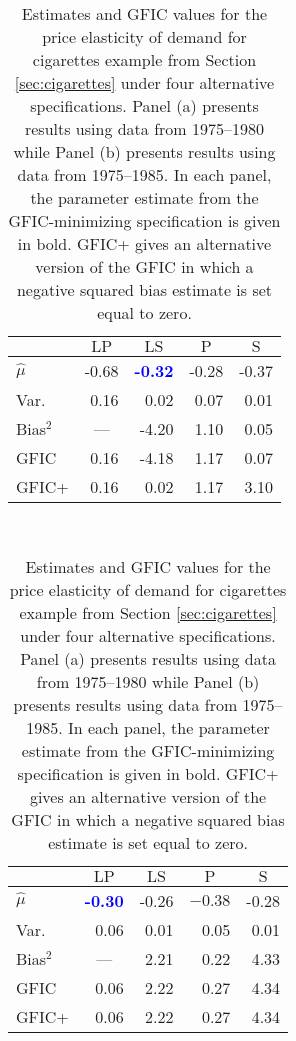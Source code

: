 \begin{table}[htbp]
    \begin{subtable}[h]{0.45\textwidth}
        \centering
 \caption{1975--1980 ($T=6$)}
 \label{tab:cigaretteShort}
      \begin{tabular}{lrrrr}\hline\hline
          & \multicolumn{1}{c}{$\text{LP}$} & \multicolumn{1}{c}{$\text{LS}$} 
          & \multicolumn{1}{c}{$\text{P}$} & \multicolumn{1}{c}{$\text{S}$}\\
          \hline
          $\widehat{\mu}$ & -0.68 & \textcolor{blue}{\textbf{-0.32}} &  -0.28 &  -0.37\\
        Var.\ &0.16 & 0.02 & 0.07 & 0.01\\ 
        Bias$^2$ & \multicolumn{1}{c}{---} & -4.20 & 1.10 & 0.05\\
        GFIC &0.16 & -4.18 & 1.17 & 0.07\\
        GFIC+ &0.16 & 0.02 & 1.17 & 3.10\\
        \hline
      \end{tabular}
    \end{subtable}
    ~
    \begin{subtable}[h]{0.45\textwidth}
      \centering
      \caption{1975--1985 ($T=11$)}
      \label{tab:cigaretteLong}
      \begin{tabular}{lrrrr}\hline\hline 
          & \multicolumn{1}{c}{$\text{LP}$} & \multicolumn{1}{c}{$\text{LS}$} 
          & \multicolumn{1}{c}{$\text{P}$} & \multicolumn{1}{c}{$\text{S}$}\\
        \hline
        $\widehat{\mu}$ & \textcolor{blue}{\textbf{-0.30}} & -0.26 &  $-0.38$ &  -0.28\\
        Var.\ & 0.06 & 0.01 & 0.05 & 0.01\\ 
        Bias$^2$ & \multicolumn{1}{c}{---} & 2.21 & 0.22 & 4.33\\
        GFIC  &0.06 & 2.22 & 0.27 &  4.34\\
        GFIC+  & 0.06 & 2.22 & 0.27 &  4.34\\
        \hline
      \end{tabular}
    \end{subtable}
    \caption{Estimates and GFIC values for the price elasticity of demand for cigarettes example from Section \ref{sec:cigarettes} under four alternative specifications. Panel (a) presents results using data from 1975--1980 while Panel (b) presents results using data from 1975--1985. In each panel, the parameter estimate from the GFIC-minimizing specification is given in bold. GFIC+ gives an alternative version of the GFIC in which a negative squared bias estimate is set equal to zero.}
\end{table}







